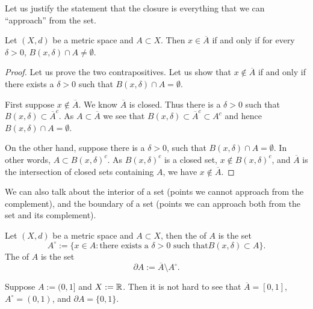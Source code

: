 Let us justify the statement that the closure is everything that we can
``approach'' from the set.

\begin{prop} \label{prop:msclosureappr}
Let $(X,d)$ be a metric space and $A \subset X$.  Then $x \in \overline{A}$
if and only if for every $\delta > 0$, $B(x,\delta) \cap A \not=\emptyset$.
\end{prop}

\begin{proof}
Let us prove the two contrapositives.
Let us show that $x \notin \overline{A}$ if and only if there exists
a $\delta > 0$ such that $B(x,\delta) \cap A = \emptyset$.

First suppose $x \notin \overline{A}$.  We know $\overline{A}$ is
closed.  Thus there is a $\delta > 0$ such that
$B(x,\delta) \subset \overline{A}^c$.  As $A \subset \overline{A}$ we
see that $B(x,\delta) \subset \overline{A}^c \subset A^c$ and hence
$B(x,\delta) \cap A = \emptyset$.

On the other hand, suppose there is a $\delta > 0$, such that
$B(x,\delta) \cap A = \emptyset$. 
In other words,
$A \subset {B(x,\delta)}^c$.
As 
${B(x,\delta)}^c$ is a closed set, $x \not \in {B(x,\delta)}^c$,
and $\overline{A}$ is the intersection
of closed sets containing $A$, we have $x \notin \overline{A}$.
\end{proof}

We can also talk about the interior of a set
(points we cannot approach from the complement),
and the boundary of a set (points we can
approach both from the set and its complement).

\begin{defn}
Let $(X,d)$ be a metric space and $A \subset X$, then
the \emph{} of $A$ is the set
\begin{equation*}
A^\circ := \{ x \in A : \text{there exists a $\delta > 0$ such that
$B(x,\delta) \subset A$} \} .
\end{equation*}
The \emph{} of $A$ is the set
\begin{equation*}
\partial A := \overline{A}\setminus A^\circ.
\end{equation*}
\end{defn}

\begin{example}
Suppose $A:=(0,1]$ and $X := {\mathbb{R}}$.  Then it is not hard
to see that $\overline{A}=[0,1]$, $A^\circ = (0,1)$,
and $\partial A = \{ 0, 1 \}$.
\end{example}

